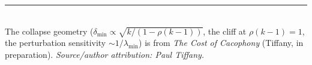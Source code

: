 \documentclass[11pt]{article}
\theoremstyle{definition}
\theoremstyle{remark}
\newcommand{\lmin}{\lambda_{\min}}
\begin{document}
\bigskip
\noindent\rule{\linewidth}{0.4pt}\\[0.3em]
\footnotesize
The collapse geometry ($\delta_{\min}\propto\sqrt{k/(1-\rho(k-1))}$, the cliff at $\rho(k-1)=1$,
the perturbation sensitivity $\sim 1/\lmin$) is from \emph{The Cost of Cacophony} (Tiffany, in
preparation). \emph{Source/author attribution: Paul Tiffany.}
\end{document}
